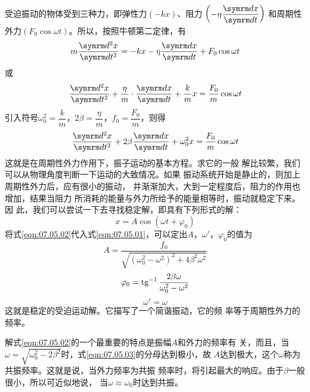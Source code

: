 受迫振动的物体受到三种力，即弹性力$ \left( - k x \right) $、阻力
$ \left( - \eta \dfrac { \dif x } { \dif t } \right) $
和周期性外力$ \left( F _ { 0 } \cos \omega t \right) $。所以，按照牛顿第二定律，有
\begin{equation*}
    m \frac { \dif ^ { 2 } x } { \dif t ^ { 2 } } = - k x - \eta \frac { \dif x } { \dif t } + F _ { 0 } \cos \omega t
\end{equation*}
或
\begin{equation*}
    \frac { \dif ^ { 2 } x } { \dif t ^ { 2 } } + \frac { \eta } { m } \cdot \frac { \dif x } { \dif t } + \frac { k } { m } x = \frac { F _ { 0 } } { m } \cos \omega t
  \end{equation*}
引入符号$ \omega _ { 0 } ^ { 2 } = \dfrac { k } { m } $，$ 2 \beta = \dfrac { \eta } { m } $，$ f _ { 0 } = \dfrac { F _ { 0 } } { m } $，则得
\begin{equation}\label{eqn:07.05.01}
    \frac { \dif ^ { 2 } x } { \dif t ^ { 2 } } + 2 \beta \frac { \dif x } { \dif t } + \omega _ { 0 } ^ { 2 } x = \frac { F _ { 0 } } { m } \cos \omega t
\end{equation}
这就是在周期性外力作用下，振子运动的基本方程。求它的一般
解比较繁，我们可以从物理角度判断一下运动的大致情况。如果
振动系统开始是静止的，则加上周期性外力后，应有很小的振动，
并渐渐加大，大到一定程度后，阻力的作用也增加，结果当阻力
所消耗的能量与外力所给予的能量相等时，振动就稳定下来。因
此，我们可以尝试一下去寻找稳定解，即具有下列形式的解：
\begin{equation}\label{eqn:07.05.02}
    x = A \cos \left( \omega t + \varphi _ { 0 } \right)
\end{equation}
将式\ref{eqn:07.05.02}代入式\ref{eqn:07.05.01}，可以定出$ A $，$  \omega ' $，$ \varphi_{ 0 } $的值为
\begin{equation}\label{eqn:07.05.03}
    A = \frac { f _ { 0 } } { \sqrt { \left( \omega_{ 0 } ^ { 2 } - \omega ^ { 2 } \right) ^ { 2 } + 4 \beta ^ { 2 } \omega ^ { 2 } }}
\end{equation}
\begin{equation}\label{eqn:07.05.04}
    \varphi _ { 0 } = \operatorname{tg} ^ { - 1 } \frac { 2 \beta \omega } { \omega_{ 0 } ^ { 2 } - \omega ^ { 2 } }
\end{equation}
\begin{equation}\label{eqn:07.05.05}
    \omega ' = \omega
\end{equation}
这就是稳定的受迫运动解。它描写了一个简谐振动，它的频
率等于周期性外力的频率。

解式\eqref{eqn:07.05.02}的一个最重要的特点是振幅$ A $和外力的频率有
关，而且，当$ \omega = \sqrt { \omega _ { 0 } ^ { 2 } - 2 \beta ^ { 2 } } $时，式\eqref{eqn:07.05.03}的分母达到极小，故
$ A $达到极大，这个$ \omega $称为共振频率。这就是说，当外力频率为共振
频率时，将引起最大的响应。由于$ \beta $一般很小，所以可近似地说，
当$ \omega \approx \omega _ { 0 } $时达到共振。

